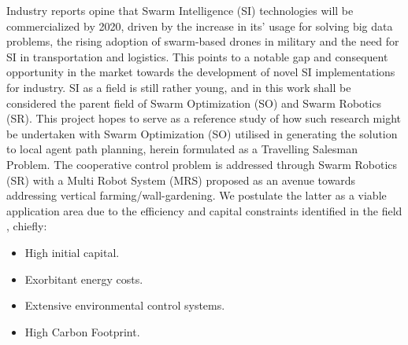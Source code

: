 \documentclass{report}
\begin{document}
Industry reports \cite{Swarm2030} opine that Swarm Intelligence (SI) technologies will be commercialized by 2020, driven by the increase in its' usage for solving big data problems, the rising adoption of swarm-based drones in military and the need for SI in transportation and logistics. This points to a notable gap and consequent opportunity in the market towards the development of novel SI implementations for industry. SI as a field is still rather young, and in this work shall be considered the parent field of Swarm Optimization (SO) and Swarm Robotics (SR). This project hopes to serve as a reference study of how such research might be undertaken with Swarm Optimization (SO) utilised in generating the solution to local agent path planning, herein formulated as a Travelling Salesman Problem. The cooperative control problem is addressed through Swarm Robotics (SR) with a Multi Robot System (MRS) proposed as an avenue towards addressing vertical farming/wall-gardening. We postulate the latter as a viable application area due to the efficiency and capital constraints identified in the field \cite{Holt2018}, chiefly:
\begin{itemize}
	\item High initial capital.
	\item Exorbitant energy costs.
	\item Extensive environmental control systems.
	\item High Carbon Footprint.
\end{itemize}
\end{document}
